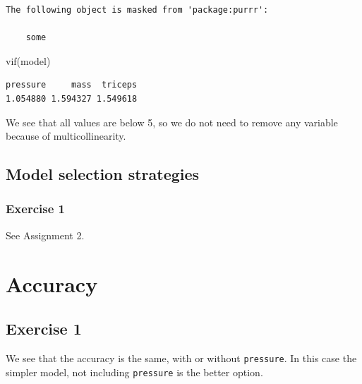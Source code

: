 \documentclass[
  letterpaper,
  DIV=11,
  numbers=noendperiod]{scrreprt}
\newenvironment{Shaded}{\begin{snugshade}}{\end{snugshade}}
\newcommand{\FunctionTok}[1]{\textcolor[rgb]{0.28,0.35,0.67}{#1}}
\newcommand{\NormalTok}[1]{\textcolor[rgb]{0.00,0.23,0.31}{#1}}
\begin{document}
\begin{verbatim}
The following object is masked from 'package:purrr':

    some
\end{verbatim}

\begin{Shaded}
\begin{Highlighting}[]
\FunctionTok{vif}\NormalTok{(model)}
\end{Highlighting}
\end{Shaded}

\begin{verbatim}
pressure     mass  triceps 
1.054880 1.594327 1.549618 
\end{verbatim}

We see that all values are below 5, so we do not need to remove any
variable because of multicollinearity.

\subsection{Model selection
strategies}\label{model-selection-strategies-2}

\subsubsection{Exercise 1}\label{exercise-1-35}

See Assignment 2.

\section{Accuracy}\label{accuracy-1}

\subsection{Exercise 1}\label{exercise-1-36}

We see that the accuracy is the same, with or without \texttt{pressure}.
In this case the simpler model, not including \texttt{pressure} is the
better option.
\end{document}
